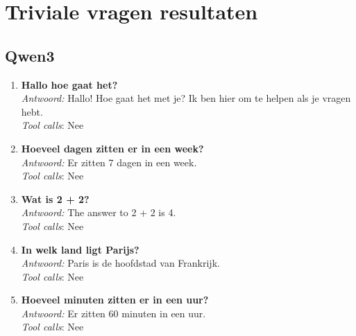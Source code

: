 \section{Triviale vragen resultaten}
\label{triviale-vragen-resultaten}

\subsection{Qwen3}
\begin{enumerate}
    \item \textbf{Hallo hoe gaat het?}\\
    \textit{Antwoord:} Hallo! Hoe gaat het met je? Ik ben hier om te helpen als je vragen hebt.\\
    \textit{Tool calls}: Nee
    \item \textbf{Hoeveel dagen zitten er in een week?}\\
    \textit{Antwoord:} Er zitten 7 dagen in een week.\\
    \textit{Tool calls}: Nee 
    \item \textbf{Wat is 2 + 2?}\\
    \textit{Antwoord:} The answer to 2 + 2 is 4. \\
    \textit{Tool calls}: Nee 
    \item \textbf{In welk land ligt Parijs?}\\
    \textit{Antwoord:} Paris is de hoofdstad van Frankrijk. \\
    \textit{Tool calls}: Nee 
    \item \textbf{Hoeveel minuten zitten er in een uur?}\\
    \textit{Antwoord:} Er zitten 60 minuten in een uur. \\
    \textit{Tool calls}: Nee 
\end{enumerate}

